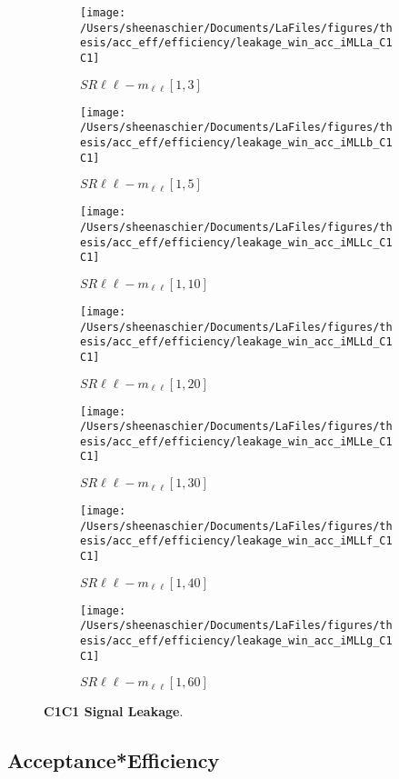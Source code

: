\begin{figure}
        \centering
    \begin{subfigure}[b]{0.44\textwidth}
        \texttt{[image: /Users/sheenaschier/Documents/LaFiles/figures/thesis/acc\_eff/efficiency/leakage\_win\_acc\_iMLLa\_C1C1]}
    \caption{$SR\ell\ell-m_{\ell\ell} [1, 3]$}
    \end{subfigure}
    \begin{subfigure}[b]{0.44\textwidth}
        \texttt{[image: /Users/sheenaschier/Documents/LaFiles/figures/thesis/acc\_eff/efficiency/leakage\_win\_acc\_iMLLb\_C1C1]}
    \caption{$SR\ell\ell-m_{\ell\ell} [1, 5]$}
    \end{subfigure}
    \begin{subfigure}[b]{0.44\textwidth}
        \texttt{[image: /Users/sheenaschier/Documents/LaFiles/figures/thesis/acc\_eff/efficiency/leakage\_win\_acc\_iMLLc\_C1C1]}
    \caption{$SR\ell\ell-m_{\ell\ell} [1, 10]$}
    \end{subfigure}
    \begin{subfigure}[b]{0.44\textwidth}
        \texttt{[image: /Users/sheenaschier/Documents/LaFiles/figures/thesis/acc\_eff/efficiency/leakage\_win\_acc\_iMLLd\_C1C1]}
    \caption{$SR\ell\ell-m_{\ell\ell} [1, 20]$}
    \end{subfigure}
    \begin{subfigure}[b]{0.44\textwidth}
        \texttt{[image: /Users/sheenaschier/Documents/LaFiles/figures/thesis/acc\_eff/efficiency/leakage\_win\_acc\_iMLLe\_C1C1]}
    \caption{$SR\ell\ell-m_{\ell\ell} [1, 30]$}
    \end{subfigure}
    \begin{subfigure}[b]{0.44\textwidth}
        \texttt{[image: /Users/sheenaschier/Documents/LaFiles/figures/thesis/acc\_eff/efficiency/leakage\_win\_acc\_iMLLf\_C1C1]}
    \caption{$SR\ell\ell-m_{\ell\ell} [1, 40]$}
    \end{subfigure}
    \begin{subfigure}[b]{0.44\textwidth}
        \texttt{[image: /Users/sheenaschier/Documents/LaFiles/figures/thesis/acc\_eff/efficiency/leakage\_win\_acc\_iMLLg\_C1C1]}
    \caption{$SR\ell\ell-m_{\ell\ell} [1, 60]$}
    \end{subfigure}
    \caption{\label{fig:c1c1_leakage}\textbf{C1C1 Signal Leakage}.}
\end{figure}

\FloatBarrier
\subsection{Acceptance*Efficiency}

